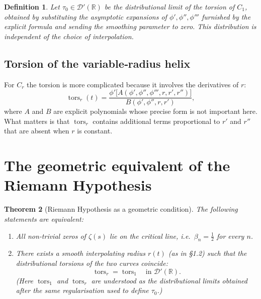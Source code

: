 \documentclass[12pt,a4paper]{article}
\newtheorem{theorem}{Theorem}[section]
\newtheorem{definition}[theorem]{Definition}
\newcommand{\R}{\mathbb{R}}
\newcommand{\dist}{\mathcal{D}'}
\DeclareMathOperator{\tors}{tors}
\begin{document}
\begin{definition}
Let $\tau_0\in\dist(\R)$ be the distributional limit of the torsion of $C_1$, obtained by substituting the asymptotic expansions of $\phi',\phi'',\phi'''$ furnished by the explicit formula and sending the smoothing parameter to zero.  This distribution is independent of the choice of interpolation.
\end{definition}

\subsection{Torsion of the variable‑radius helix}
For $C_r$ the torsion is more complicated because it involves the derivatives of $r$:
\[
\tors_r(t)=\frac{\phi'\bigl[A(\phi',\phi'',\phi''',r,r',r'')\bigr]}
                   {B(\phi',\phi'',r,r')},
\tag{2}
\]
where $A$ and $B$ are explicit polynomials whose precise form is not important here.  What matters is that $\tors_r$ contains additional terms proportional to $r'$ and $r''$ that are absent when $r$ is constant.

\section{The geometric equivalent of the Riemann Hypothesis}

\begin{theorem}[Riemann Hypothesis as a geometric condition]\label{thm:main}
The following statements are equivalent:
\begin{enumerate}
\item[(A)] All non‑trivial zeros of $\zeta(s)$ lie on the critical line, i.e.\ $\beta_n=\tfrac12$ for every $n$.
\item[(B)] There exists a smooth interpolating radius $r(t)$ (as in §1.2) such that the distributional torsions of the two curves coincide:
\[
\tors_r = \tors_1 \quad \text{in } \dist(\R).
\]
(Here $\tors_1$ and $\tors_r$ are understood as the distributional limits obtained after the same regularisation used to define $\tau_0$.)
\end{enumerate}
\end{theorem}
\end{document}

